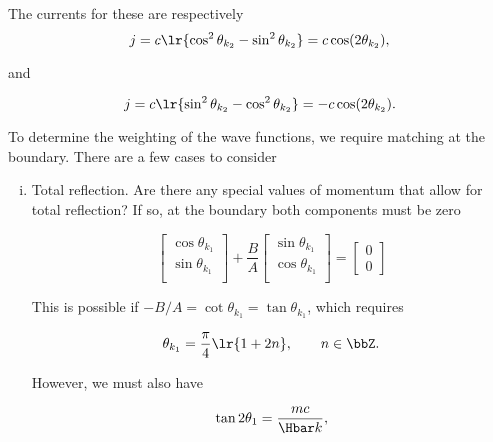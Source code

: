 The currents for these are respectively
\begin{dmath}\label{eqn:gradQuantumProblemSet4Problem3:1321}
j = c \lr{ \cos^2\theta_{k_2} - \sin^2\theta_{k_2} } = c \cos(2\theta_{k_2}),
\end{dmath}

and 

\begin{dmath}\label{eqn:gradQuantumProblemSet4Problem3:1341}
j = c \lr{ \sin^2\theta_{k_2} - \cos^2\theta_{k_2} } = -c \cos(2\theta_{k_2}).
\end{dmath}

To determine the weighting of the wave functions, we require matching at the boundary.  There are a few cases to consider

\begin{enumerate}[(i)]
\item Total reflection.  Are there any special values of momentum that allow for total reflection?  If so, at the boundary both components must be zero

\begin{dmath}\label{eqn:gradQuantumProblemSet4Problem3:720}
\begin{bmatrix}
\cos\theta_{k_1} \\
\sin\theta_{k_1} \\
\end{bmatrix}
+
\frac{B}{A}
\begin{bmatrix}
\sin\theta_{k_1} \\
\cos\theta_{k_1} \\
\end{bmatrix}
=
\begin{bmatrix}
0 \\
0
\end{bmatrix}
\end{dmath}

This is possible if \( -B/A = \cot\theta_{k_1} = \tan\theta_{k_1} \), which requires

\begin{equation}\label{eqn:gradQuantumProblemSet4Problem3:740}
\theta_{k_1} = \frac{\pi}{4} \lr{ 1 + 2 n }, \qquad n \in \bbZ.
\end{equation}

However, we must also have

\begin{dmath}\label{eqn:gradQuantumProblemSet4Problem3:760}
\tan 2 \theta_1 = \frac{m c}{\Hbar k},
\end{dmath}


\end{enumerate}
